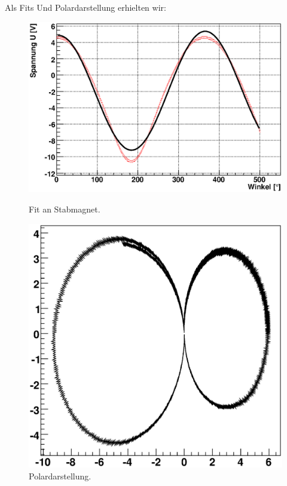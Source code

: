 \documentclass[12pt]{article}
\begin{document}
Als Fits Und Polardarstellung erhielten wir:
\begin{figure}[H]  
\begin{minipage}{0.5\linewidth}
\centering
\includegraphics[width=0.9\linewidth]{pictures/magnet.eps}
\caption{Fit an Stabmagnet.}
\end{minipage}
\begin{minipage}{0.5\linewidth}
\centering 
\includegraphics[width=0.9\linewidth]{pictures/magnetvd.eps}
\caption{Polardarstellung.}
\end{minipage}
\end{figure}
\end{document}
